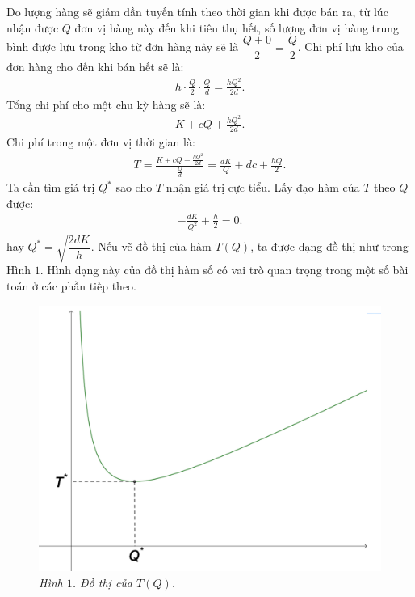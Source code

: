 \begin{multicols}{2}
	\vskip 0.1cm
	Do lượng hàng sẽ giảm dần tuyến tính theo thời gian khi được bán ra, từ lúc nhận được $Q$ đơn vị hàng này đến khi tiêu thụ hết, số lượng đơn vị hàng trung bình được lưu trong kho từ đơn hàng này sẽ là $\dfrac{Q + 0}{2} = \dfrac{Q}{2}$. Chi phí lưu kho của đơn hàng cho đến khi bán hết sẽ là:
	\begin{align*}
		h\cdot \frac{Q}{2}\cdot \frac{Q}{d}=\frac{hQ^2}{2d}.
	\end{align*}
	Tổng chi phí cho một chu kỳ hàng sẽ là:
	\begin{align*}
		K + cQ + \frac{hQ^2}{2d}.
	\end{align*}
	Chi phí trong một đơn vị thời gian là:
	\begin{align*}
		T = \frac{K + cQ + \frac{hQ^2}{2d}}{\frac{Q}{d}} = \frac{dK}{Q} + dc + \frac{hQ}{2}.
	\end{align*}
	Ta cần tìm giá trị $Q^*$ sao cho $T$ nhận giá trị cực tiểu. Lấy đạo hàm của $T$ theo $Q$ được:
	\begin{align*}
		-\frac{dK}{Q^2} + \frac{h}{2} = 0.
	\end{align*}
	hay $Q^* = \sqrt{\dfrac{2dK}{h}}$.
	\vskip 0.1cm
	Nếu vẽ đồ thị của hàm $T(Q)$, ta được dạng đồ thị như trong Hình $1$. Hình dạng này của đồ thị hàm số có vai trò quan trọng trong một số bài toán ở các phần tiếp theo.
	\begin{figure}[H]
		\vspace*{-5pt}
		\centering
		\captionsetup{labelformat= empty, justification=centering}
		\includegraphics[width= 1\linewidth]{2}
		\caption{\small\textit{\color{toanhocdoisong}Hình $1$. Đồ thị của $T(Q)$.}}

\end{figure}
\end{multicols}
